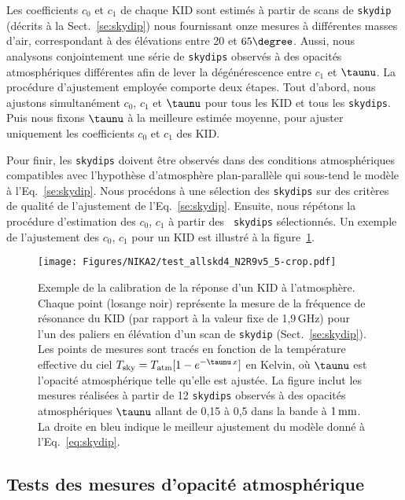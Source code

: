 Les coefficients $c_0$ et $c_1$ de chaque KID sont estimés à partir de
scans de {\tt skydip} (décrits à la Sect.~\ref{se:skydip}) nous
fournissant onze mesures à différentes masses d'air, correspondant à
des élévations entre 20 et $65\degree$. Aussi, nous
analysons conjointement une série de {\tt skydips} observés à des
opacités atmosphériques différentes afin de lever la dégénérescence
entre $c_1$ et $\taunu$. La procédure d'ajustement employée comporte
deux étapes. Tout d'abord, nous ajustons simultanément $c_0$, $c_1$ et
$\taunu$ pour tous les KID et tous les {\tt skydips}. Puis nous fixons
$\taunu$ à la meilleure estimée moyenne, pour ajuster uniquement les
coefficients $c_0$ et $c_1$ des KID.

Pour finir, les {\tt skydips} doivent être observés dans des
conditions atmosphériques compatibles avec l'hypothèse d'atmosphère
plan-parallèle qui sous-tend le modèle à l'Eq.~\ref{se:skydip}. Nous
procédons à une sélection des {\tt skydips} sur des critères de
qualité de l'ajustement de l'Eq.~\ref{se:skydip}. Ensuite, nous
répétons la procédure d'estimation des $c_0$, $c_1$ à partir des {\tt
  skydips} sélectionnés. Un exemple de l'ajustement des $c_0$, $c_1$
pour un KID est illustré à la figure~\ref{fig:skydipfitexample}. 
%
\begin{figure}[!htbp]
\begin{center}
\texttt{[image: Figures/NIKA2/test\_allskd4\_N2R9v5\_5-crop.pdf]}
\caption[]{Exemple de la calibration de la réponse d'un KID à
  l'atmosphère. Chaque point (losange noir) représente la mesure de la
  fréquence de résonance du KID (par rapport à la valeur fixe de
  1,9\,GHz) pour l'un des paliers en élévation d'un scan de {\tt skydip}
  (Sect.~\ref{se:skydip}). Les points de mesures sont tracés en
  fonction de la température effective du ciel
  $T_{\rm{sky}} = T_{\rm{atm}}[1-e^{-\taunu\, x}]$ en Kelvin, où
  $\taunu$ est l'opacité atmosphérique telle qu'elle est ajustée. 
  La figure inclut les mesures réalisées à
  partir de 12 {\tt skydips} observés à des opacités atmosphériques
  $\taunu$ allant de 0,15 à 0,5 dans la bande à $1\,\rm{mm}$.
  La droite en bleu indique le meilleur ajustement du modèle donné à
  l'Eq.~\ref{eq:skydip}.}
\label{fig:skydipfitexample}
\end{center}
\end{figure}
%

\subsection{Tests des mesures d'opacité atmosphérique}
\label{se:opacity_tests}

